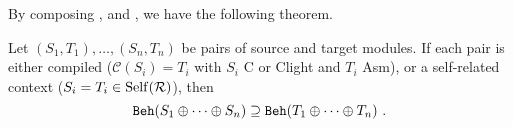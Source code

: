 
By composing ,  and , we have the following theorem.
\begin{theorem} \label{thm:results-compiler2}
  Let $(S_1,T_1), \ldots, (S_n,T_n)$ be pairs of source and target modules.
  If each pair is either compiled (\ie $\mathcal{C}(S_i) = T_i$ with $S_i$ \textrm{\cc{} C} or \textrm{Clight} and $T_i$ \textrm{Asm}), or a self-related context (\ie $S_i = T_i \in \mathrm{Self}(\mathcal{R})$), then
  \[
    \mathtt{Beh}({S_1 \oplus \cdots \oplus S_n}) \supseteq \mathtt{Beh}({T_1 \oplus \cdots \oplus T_n})~.
  \]
\end{theorem}

